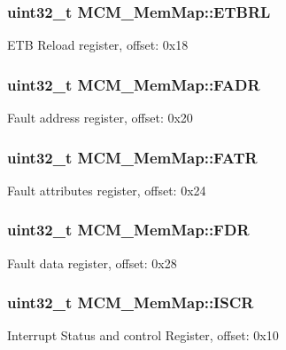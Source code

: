 \subsubsection[{E\+T\+B\+R\+L}]{\setlength{\rightskip}{0pt plus 5cm}uint32\+\_\+t M\+C\+M\+\_\+\+Mem\+Map\+::\+E\+T\+B\+R\+L}\label{struct_m_c_m___mem_map_ae4d8c3979038482e324840c3bfa856d7}
E\+T\+B Reload register, offset\+: 0x18 \hypertarget{struct_m_c_m___mem_map_a24197ee74384716a50d20fcff8808e23}{}
\subsubsection[{F\+A\+D\+R}]{\setlength{\rightskip}{0pt plus 5cm}uint32\+\_\+t M\+C\+M\+\_\+\+Mem\+Map\+::\+F\+A\+D\+R}\label{struct_m_c_m___mem_map_a24197ee74384716a50d20fcff8808e23}
Fault address register, offset\+: 0x20 \hypertarget{struct_m_c_m___mem_map_abb947ea49f229a18c367c028b2512619}{}
\subsubsection[{F\+A\+T\+R}]{\setlength{\rightskip}{0pt plus 5cm}uint32\+\_\+t M\+C\+M\+\_\+\+Mem\+Map\+::\+F\+A\+T\+R}\label{struct_m_c_m___mem_map_abb947ea49f229a18c367c028b2512619}
Fault attributes register, offset\+: 0x24 \hypertarget{struct_m_c_m___mem_map_a39ba2ce19e224175a9164c1781bf16c3}{}
\subsubsection[{F\+D\+R}]{\setlength{\rightskip}{0pt plus 5cm}uint32\+\_\+t M\+C\+M\+\_\+\+Mem\+Map\+::\+F\+D\+R}\label{struct_m_c_m___mem_map_a39ba2ce19e224175a9164c1781bf16c3}
Fault data register, offset\+: 0x28 \hypertarget{struct_m_c_m___mem_map_a69e6005b95d37157e53bfcd24535c55e}{}
\subsubsection[{I\+S\+C\+R}]{\setlength{\rightskip}{0pt plus 5cm}uint32\+\_\+t M\+C\+M\+\_\+\+Mem\+Map\+::\+I\+S\+C\+R}\label{struct_m_c_m___mem_map_a69e6005b95d37157e53bfcd24535c55e}
Interrupt Status and control Register, offset\+: 0x10 \hypertarget{struct_m_c_m___mem_map_a41b1890f596f706bcd94c2d49c1e44f7}{}
